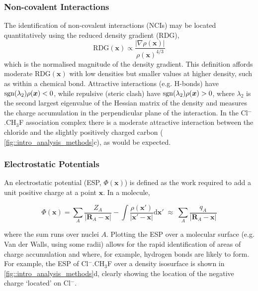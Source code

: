 \documentclass[main.tex]{subfiles}
\begin{document}
\subsubsection{Non-covalent Interactions}

The identification of non-covalent interactions (NCIs) may be located quantitatively using the reduced density gradient (RDG),\cite{Johnson2010}
\begin{equation}
	\text{RDG}(\boldsymbol{x}) \propto \frac{|\nabla \rho(\boldsymbol{x})|}{\rho(\boldsymbol{x})^{4/3}}
\end{equation}
which is the normalised magnitude of the density gradient. This definition affords moderate $\text{RDG}(\boldsymbol{x})$ with low densities but smaller values at higher density, such as within a chemical bond. Attractive interactions (e.g. H-bonds) have $\operatorname{sgn}(\lambda_2)\rho(\boldsymbol{x})  < 0$, while repulsive (steric clash) have $\operatorname{sgn}(\lambda_2)\rho(\boldsymbol{x}) > 0$, where $\lambda_2$ is the second largest eigenvalue of the Hessian matrix of the density and measures the charge accumulation in the perpendicular plane of the interaction.\cite{Laplaza2020} In the Cl${}^{-}$.CH${}_3$F association complex there is a moderate attractive interaction between the chloride and the slightly positively charged carbon (\figurename{ \ref{fig::intro_analysis_methods}c}), as would be expected.


\subsubsection{Electrostatic Potentials}

An electrostatic potential (ESP, $\Phi(\boldsymbol{x})$) is defined as the work required to add a unit positive charge at a point $\boldsymbol{x}$. In a molecule,

\begin{equation}
	\Phi(\boldsymbol{x}) = \sum_A \frac{Z_A}{|\boldsymbol{R}_A - \boldsymbol{x}|} - \int \frac{\rho(\boldsymbol{x'})}{|\boldsymbol{x'} - \boldsymbol{x}|} \text{d}\boldsymbol{x}' \;\approx\; \sum_A \frac{q_A}{|\boldsymbol{R}_A - \boldsymbol{x}|}
\end{equation}

where the sum runs over nuclei $A$. Plotting the ESP over a molecular surface (e.g. Van der Walls, using some radii) allows for the rapid identification of areas of charge accumulation and where, for example, hydrogen bonds are likely to form.\cite{Politzer2001} For example, the ESP of Cl${}^{-}$.CH${}_3$F over a density isosurface is shown in \figurename{ \ref{fig::intro_analysis_methods}d}, clearly showing the location of the negative charge `located' on Cl${}^{-}$.
\end{document}
